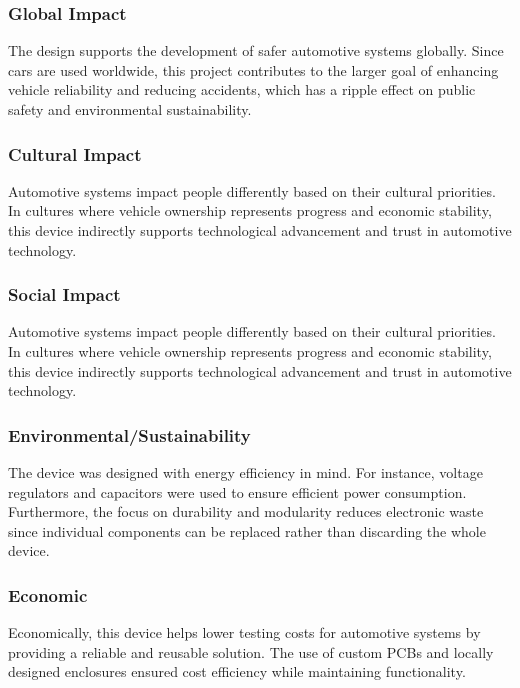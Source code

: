 \documentclass[12pt]{article}
\begin{document}
\subsubsection{Global Impact}
The design supports the development of safer automotive systems globally. Since
cars are used worldwide, this project contributes to the larger goal of
enhancing vehicle reliability and reducing accidents, which has a ripple effect
on public safety and environmental sustainability.


\subsubsection{Cultural Impact}
Automotive systems impact people differently based on their cultural
priorities. In cultures where vehicle ownership represents progress and
economic stability, this device indirectly supports technological advancement
and trust in automotive technology.


\subsubsection{Social Impact}
Automotive systems impact people differently based on their cultural
priorities. In cultures where vehicle ownership represents progress and
economic stability, this device indirectly supports technological advancement
and trust in automotive technology.

\subsubsection{Environmental/Sustainability}
The device was designed with energy efficiency in mind. For instance, voltage
regulators and capacitors were used to ensure efficient power consumption.
Furthermore, the focus on durability and modularity reduces electronic waste
since individual components can be replaced rather than discarding the whole
device.


\subsubsection{Economic}
Economically, this device helps lower testing costs for automotive systems by
providing a reliable and reusable solution. The use of custom PCBs and locally
designed enclosures ensured cost efficiency while maintaining functionality.

\end{document}
